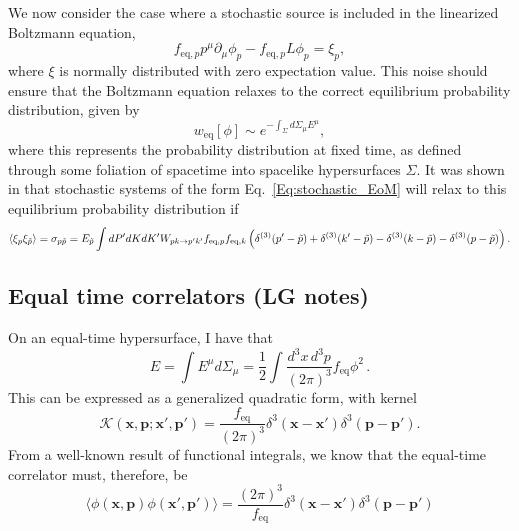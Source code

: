 \documentclass[aps,prd,preprint,nofootinbib,amsmath,amssymb,showpacs,longbibliography,singlecolumn,superscriptaddress,10pt]{revtex4-1}
\theoremstyle{plain}
\theoremstyle{definition}
\begin{document}
We now consider the case where a stochastic source is included in the linearized Boltzmann equation, 
\begin{equation} \label{Eq:stochastic_EoM}
   f_{\mathrm{eq},p} p^{\mu} \partial_{\mu} \phi_p - f_{\mathrm{eq},p} L \phi_p = \xi_p ,
\end{equation}
where $\xi$ is normally distributed with zero expectation value. This noise should ensure that the Boltzmann equation relaxes to the correct equilibrium probability distribution, given by 
\begin{equation}
    w_{\mathrm{eq}}[\phi] \sim e^{-\int_{\Sigma} d\Sigma_{\mu} E^{\mu}} ,
\end{equation}
where this represents the probability distribution at fixed time, as defined through some foliation of spacetime into spacelike hypersurfaces $\Sigma$. It was shown in \cite{Mullins:2023tjg, Mullins:2023ott} that stochastic systems of the form Eq.\ \eqref{Eq:stochastic_EoM} will relax to this equilibrium probability distribution if 
\begin{equation}
    \langle \xi_p \xi_{\Tilde{p}} \rangle = \sigma_{p\Tilde{p}} = E_{\tilde{p}} \int dP' dK dK' W_{pk\rightarrow p'k'} f_{\mathrm{eq},p} f_{\mathrm{eq},k} \left( \delta^{(3)}(p'-\tilde{p}) + \delta^{(3)}(k'-\tilde{p}) - \delta^{(3)}(k-\tilde{p}) - \delta^{(3)}(p-\tilde{p}) \right) .
\end{equation}


\subsection{Equal time correlators (LG notes)}

On an equal-time hypersurface, I have that
\begin{equation}
    E=\int E^\mu d\Sigma_\mu =\dfrac{1}{2} \int \dfrac{d^3 x \, d^3p}{(2\pi)^3} f_{\text{eq}}\phi^2 \, .
\end{equation}
This can be expressed as a generalized quadratic form, with kernel
\begin{equation}
    \mathcal{K}(\textbf{x},\textbf{p}; \textbf{x}',\textbf{p}')= \dfrac{f_{\text{eq}}}{(2\pi)^3} \delta^3(\textbf{x}-\textbf{x}')\delta^3(\textbf{p}-\textbf{p}').
\end{equation}
From a well-known result of functional integrals, we know that the equal-time correlator must, therefore, be
\begin{equation}
   \langle \phi(\textbf{x},\textbf{p})\phi(\textbf{x}',\textbf{p}')\rangle  = \dfrac{(2\pi)^3}{f_{\text{eq}}} \delta^3(\textbf{x}-\textbf{x}')\delta^3(\textbf{p}-\textbf{p}')
\end{equation}
\end{document}
